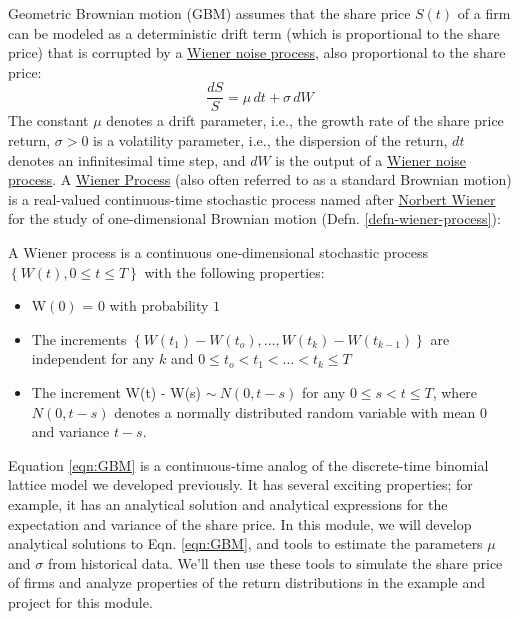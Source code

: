 \documentclass[11pt]{article}
\theoremstyle{definition}
\begin{document}
Geometric Brownian motion (GBM) assumes that the share price $S(t)$ of a firm can be modeled as a deterministic
drift term (which is proportional to the share price) that is corrupted by a \href{https://en.wikipedia.org/wiki/Wiener_process}{Wiener noise process}, also proportional to the share price:
\begin{equation}\label{eqn:GBM}
\frac{dS}{S} = {\mu}\,dt + \sigma\,{dW}
\end{equation}
The constant $\mu$ denotes a drift parameter, i.e., the growth rate of the share price return, $\sigma>0$ is a volatility parameter, i.e., 
the dispersion of the return, $dt$ denotes an infinitesimal time step, and $dW$ is the output of a 
\href{https://en.wikipedia.org/wiki/Wiener_process}{Wiener noise process}.  A \href{https://en.wikipedia.org/wiki/Wiener_process)}{Wiener Process} 
(also often referred to as a standard Brownian motion) is a real-valued continuous-time stochastic 
process named after \href{https://en.wikipedia.org/wiki/Norbert_Wiener}{Norbert Wiener} for the study of one-dimensional Brownian motion (Defn. \ref{defn-wiener-process}):
\begin{definition}\label{defn-wiener-process}
A Wiener process is a continuous one-dimensional stochastic process $\left\{W\left(t\right), 0\leq{t}\leq{T}\right\}$ with the following properties:
\begin{itemize}
\setlength\itemsep{0em}
\item{W$\left(0\right)$ = $0$ with probability $1$}
\item{The increments $\left\{W(t_{1}) - W(t_{o}),\dots, W(t_{k}) - W(t_{k-1})\right\}$ are independent for any $k$ and $0\leq{t_{o}}< t_{1} < \dots < t_{k} \leq{T}$}
\item{The increment W(t) - W(s) $\sim~N\left(0,t-s\right)$ for any $0\leq{s}< t \leq{T}$, where $N\left(0,t-s\right)$ denotes a normally distributed random variable with mean $0$ and variance $t - s$.}
\end{itemize}
\end{definition}
Equation \ref{eqn:GBM} is a continuous-time analog of the discrete-time binomial lattice model we developed previously. 
It has several exciting properties; for example, it has an analytical solution and analytical expressions for the expectation and variance of the share price. In this module, we will develop analytical solutions to Eqn. \ref{eqn:GBM}, and tools to estimate the parameters $\mu$ and $\sigma$ from historical data. We'll then use these tools to simulate the share price of firms and analyze properties of the return distributions in the example and project for this module. 
\end{document}

